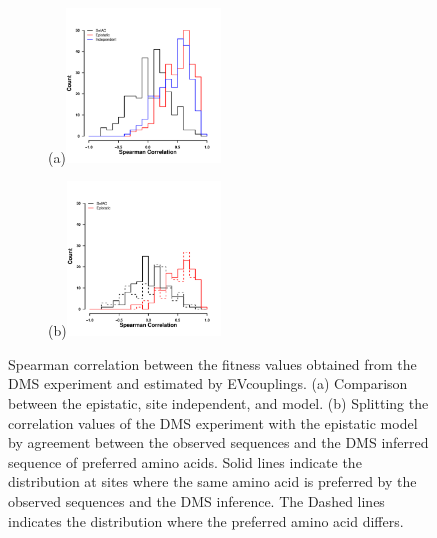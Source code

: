 \documentclass[fleqn,letterpaper]{article}
\begin{document}
\singlespacing
\begin{figure}
    \centering
    \begin{subfigure}
        \centering
        (a)\includegraphics[width=0.45\textwidth]{img/evc_comp.pdf}
    \end{subfigure}
    \begin{subfigure}
        \centering
        (b)\includegraphics[width=0.45\textwidth]{img/evc_comp_split.pdf}
    \end{subfigure}
    \caption{Spearman correlation between the fitness values obtained from the DMS experiment and estimated by EVcouplings. (a) Comparison between the epistatic, site independent, and \selac model. (b) Splitting the correlation values of the DMS experiment with the epistatic model by agreement between the observed sequences and the DMS inferred sequence of preferred amino acids. Solid lines indicate the distribution at sites where the same amino acid is preferred by the observed sequences and the DMS inference. The Dashed lines indicates the distribution where the preferred amino acid differs.}
    \label{fig:ev_fitness_comp}
\end{figure}

\doublespacing
\end{document}
